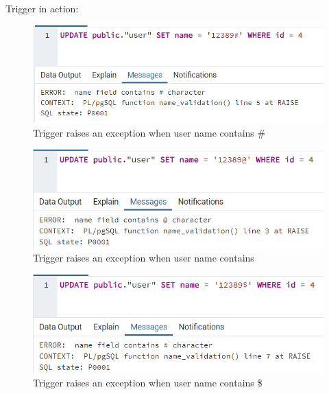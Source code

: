 Trigger in action:
\begin{center}
    \begin{figure}[h]
        \centering
        \includegraphics[]{images/validation_1}
        \caption{Trigger raises an exception when user name contains \#}
        \label{fig:db_validation_1}
    \end{figure}

    \begin{figure}[h]
        \centering
        \includegraphics[]{images/validation_2}
        \caption{Trigger raises an exception when user name contains \@}
        \label{fig:db_validation_3}
    \end{figure}
    \begin{figure}[h]
        \centering
        \includegraphics[]{images/validation_dollar}
        \caption{Trigger raises an exception when user name contains \$}
        \label{fig:db_validation_2}
    \end{figure}
\end{center}

\clearpage